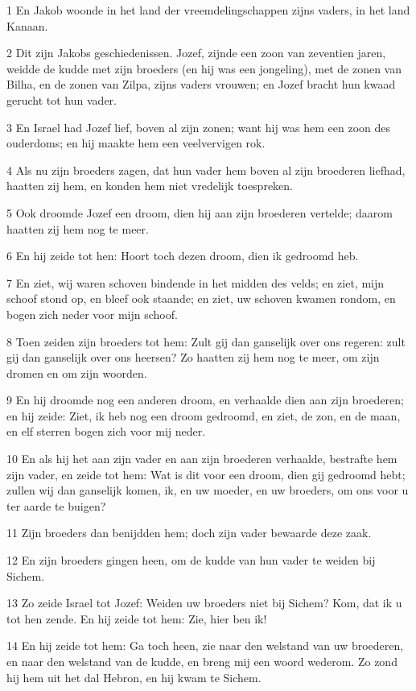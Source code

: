 \par 1 En Jakob woonde in het land der vreemdelingschappen zijns vaders, in het land Kanaan.
\par 2 Dit zijn Jakobs geschiedenissen. Jozef, zijnde een zoon van zeventien jaren, weidde de kudde met zijn broeders (en hij was een jongeling), met de zonen van Bilha, en de zonen van Zilpa, zijns vaders vrouwen; en Jozef bracht hun kwaad gerucht tot hun vader.
\par 3 En Israel had Jozef lief, boven al zijn zonen; want hij was hem een zoon des ouderdoms; en hij maakte hem een veelvervigen rok.
\par 4 Als nu zijn broeders zagen, dat hun vader hem boven al zijn broederen liefhad, haatten zij hem, en konden hem niet vredelijk toespreken.
\par 5 Ook droomde Jozef een droom, dien hij aan zijn broederen vertelde; daarom haatten zij hem nog te meer.
\par 6 En hij zeide tot hen: Hoort toch dezen droom, dien ik gedroomd heb.
\par 7 En ziet, wij waren schoven bindende in het midden des velds; en ziet, mijn schoof stond op, en bleef ook staande; en ziet, uw schoven kwamen rondom, en bogen zich neder voor mijn schoof.
\par 8 Toen zeiden zijn broeders tot hem: Zult gij dan ganselijk over ons regeren: zult gij dan ganselijk over ons heersen? Zo haatten zij hem nog te meer, om zijn dromen en om zijn woorden.
\par 9 En hij droomde nog een anderen droom, en verhaalde dien aan zijn broederen; en hij zeide: Ziet, ik heb nog een droom gedroomd, en ziet, de zon, en de maan, en elf sterren bogen zich voor mij neder.
\par 10 En als hij het aan zijn vader en aan zijn broederen verhaalde, bestrafte hem zijn vader, en zeide tot hem: Wat is dit voor een droom, dien gij gedroomd hebt; zullen wij dan ganselijk komen, ik, en uw moeder, en uw broeders, om ons voor u ter aarde te buigen?
\par 11 Zijn broeders dan benijdden hem; doch zijn vader bewaarde deze zaak.
\par 12 En zijn broeders gingen heen, om de kudde van hun vader te weiden bij Sichem.
\par 13 Zo zeide Israel tot Jozef: Weiden uw broeders niet bij Sichem? Kom, dat ik u tot hen zende. En hij zeide tot hem: Zie, hier ben ik!
\par 14 En hij zeide tot hem: Ga toch heen, zie naar den welstand van uw broederen, en naar den welstand van de kudde, en breng mij een woord wederom. Zo zond hij hem uit het dal Hebron, en hij kwam te Sichem.
